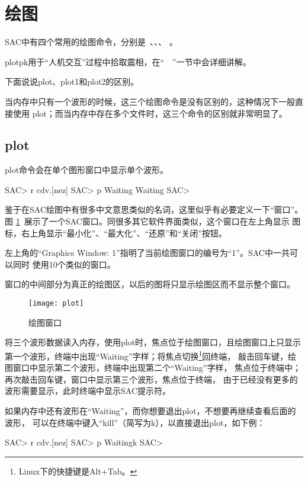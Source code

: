 \section{绘图}
\label{sec:display}

SAC中有四个常用的绘图命令，分别是~、、、
。

plotpk用于``人机交互''过程中拾取震相，在``~~''一节中会详细讲解。

下面说说plot、plot1和plot2的区别。

当内存中只有一个波形的时候，这三个绘图命令是没有区别的，这种情况下一般直接使用
plot；而当内存中存在多个文件时，这三个命令的区别就非常明显了。

\subsection{plot}
\label{subsec:plot}
plot命令会在单个图形窗口中显示单个波形。
\begin{SACCode}
SAC> r cdv.[nez]
SAC> p
Waiting
Waiting
SAC>
\end{SACCode}

鉴于在SAC绘图中有很多中文意思类似的名词，这里似乎有必要定义一下``窗口''。图
\ref{fig:plot}~展示了一个SAC窗口。同很多其它软件界面类似，这个窗口在左上角显示
图标，右上角显示``最小化''、``最大化''、``还原''和``关闭''按钮。

左上角的``Graphics Window: 1''指明了当前绘图窗口的编号为``1''。SAC中一共可以同时
使用10个类似的窗口。

窗口的中间部分为真正的绘图区，以后的图将只显示绘图区而不显示整个窗口。

\begin{figure}[H]
\centering
\texttt{[image: plot]}
\caption{绘图窗口}
\label{fig:plot}
\end{figure}

将三个波形数据读入内存，使用plot时，焦点位于绘图窗口，且绘图窗口上只显示
第一个波形，终端中出现``Waiting''字样；将焦点切换\footnote{Linux下的快捷键是Alt+Tab。}回终端，
敲击回车键，绘图窗口中显示第二个波形，终端中出现第二个``Waiting''字样，
焦点位于终端中；再次敲击回车键，窗口中显示第三个波形，焦点位于终端，
由于已经没有更多的波形需要显示，此时终端中显示SAC提示符。

如果内存中还有波形在``Waiting''，而你想要退出plot，不想要再继续查看后面的波形，
可以在终端中键入``kill''（简写为k），以直接退出plot，如下例：
\begin{SACCode}
SAC> r cdv.[nez]
SAC> p
Waitingk
SAC>
\end{SACCode}

